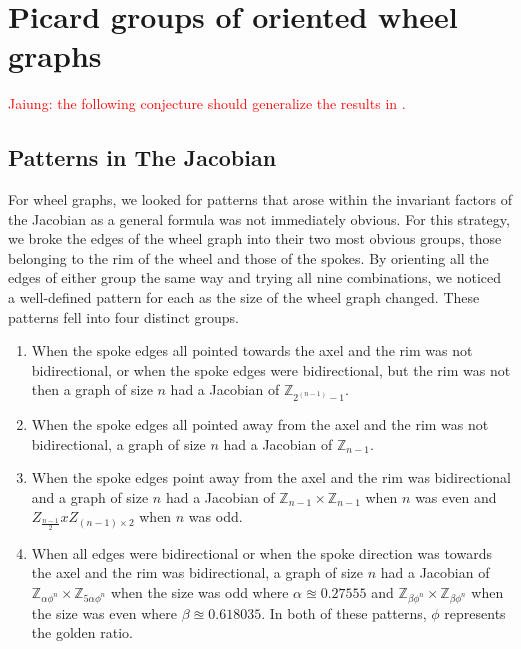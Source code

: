 \documentclass[11pt,reqno]{amsart}
\theoremstyle{definition}
\theoremstyle{plain}
\begin{document}
\section{Picard groups of oriented wheel graphs}

	\textcolor{red}{Jaiung: the following conjecture should generalize the results in \cite{biggs1999chip}.}

	\subsection{Patterns in The Jacobian}
		For wheel graphs, we looked for patterns that arose within the invariant factors of the Jacobian as
		a general formula was not immediately obvious.  For this strategy, we broke the edges of the wheel graph into
		their two most obvious groups, those belonging to the rim of the wheel and those of the spokes.  By orienting
		all the edges of either group the same way and trying all nine combinations, we noticed a well-defined pattern
		for each as the size of the wheel graph changed.  These patterns fell into four distinct groups.

		\begin{enumerate}
			\item When the spoke edges all pointed towards the axel and the rim was not bidirectional, or when
				the spoke edges were bidirectional, but the rim was not then a graph of size $n$ had a
				Jacobian of $\mathbb{Z}_{2^(n-1)-1}$.
			\item When the spoke edges all pointed away from the axel and the rim was not bidirectional,
				a graph of size $n$ had a Jacobian of $\mathbb{Z}_{n-1}$.
			\item When the spoke edges point away from the axel and the rim was bidirectional and a graph of size
				$n$ had a Jacobian of $\mathbb{Z}_{n-1} \times \mathbb{Z}_{n-1}$ when $n$ was even
				and $Z_{\frac{n-1}{2}} x Z_{(n-1) \times 2}$ when $n$ was odd.
			\item When all edges were bidirectional or when the spoke direction was towards the axel and
				the rim was bidirectional, a graph of size $n$ had a Jacobian of
				$\mathbb{Z}_{\alpha\phi^{n}} \times \mathbb{Z}_{5\alpha\phi^{n}}$ when the size
				was odd where $\alpha \approxeq 0.27555$ and $\mathbb{Z}_{\beta\phi^{n}} \times \mathbb{Z}_{\beta\phi^{n}}$
				when the size was even where $\beta \approxeq 0.618035$. In both of these patterns,
				$\phi$ represents the golden ratio.
		\end{enumerate}
\end{document}
